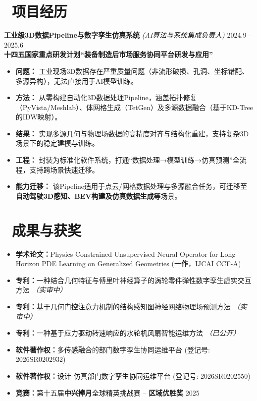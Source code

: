 \documentclass[11pt]{article}
\begin{document}
\section{\makebox[\widthof{\faBriefcase}][c]{\color{CVBlue}%
\faBriefcase}\ 项目经历}

\textbf{工业级3D数据Pipeline与数字孪生仿真系统} 
\textit{(AI算法与系统集成负责人)} 
\hfill 2024.9 -- 2025.6\\[0.2em]
\textcolor{CVBlue}{\textbf{十四五国家重点研发计划``装备制造后市场服务协同平台研发与应用''}}
\begin{itemize}
    \item \textbf{问题：} 工业现场3D数据存在严重质量问题（非流形破损、孔洞、坐标错配、多源异构），无法直接用于AI模型训练。
    \item \textbf{方法：} 从零构建自动化3D数据处理Pipeline，涵盖拓扑修复（PyVista/Meshlab）、体网格生成（TetGen）及多源数据融合（基于KD-Tree的IDW映射）。
    \item \textbf{结果：} 实现多源几何与物理场数据的高精度对齐与结构化重建，支持复杂3D场景下的稳定建模与训练。
    \item \textbf{工程：} 封装为标准化软件系统，打通“数据处理→模型训练→仿真预测”全流程，支持跨场景快速迁移。
    \item \textbf{能力迁移：} 该Pipeline适用于点云/网格数据处理与多源融合任务，可迁移至\textbf{自动驾驶3D感知、BEV构建及仿真数据生成}等场景。
\end{itemize}



\section{%
    \makebox[\widthof{\faTrophy}][c]%
    {\color{CVBlue}\faTrophy}\ 成果与获奖%
}

\begin{itemize}
    \item \textbf{学术论文：}Physics-Constrained Unsupervised Neural Operator for Long-Horizon PDE Learning on Generalized Geometries (\textbf{一作}，IJCAI CCF-A)
    \item \textbf{专利：}一种结合几何特征与傅里叶神经算子的涡轮零件弹性数字孪生虚实交互方法 \textit{（实审中）}
    \item \textbf{专利：}基于几何门控注意力机制的结构感知图神经网络物理场预测方法 \textit{（实审中）}
    \item \textbf{专利：}一种基于应力驱动转速响应的水轮机风扇智能运维方法 \textit{（已公开）}
    \item \textbf{软件著作权：}多传感融合的部门数字孪生协同运维平台 (登记号: 2026SR0202932)
    \item \textbf{软件著作权：}设计-仿真部门数字孪生协同运维平台 (登记号: 2026SR0202550)
    \item \textbf{竞赛：}第十五届\textbf{中兴捧月}全球精英挑战赛 -- \textbf{区域优胜奖} \hfill 2025
\end{itemize}
\end{document}
